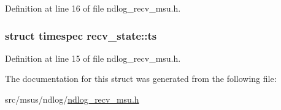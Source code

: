 Definition at line 16 of file ndlog\-\_\-recv\-\_\-msu.\-h.

\hypertarget{structrecv__state_aec1b8726e5167fb82a1b38624b3e81af}{
\subsubsection[{ts}]{\setlength{\rightskip}{0pt plus 5cm}struct timespec recv\-\_\-state\-::ts}}\label{structrecv__state_aec1b8726e5167fb82a1b38624b3e81af}


Definition at line 15 of file ndlog\-\_\-recv\-\_\-msu.\-h.



The documentation for this struct was generated from the following file\-:\begin{DoxyCompactItemize}
\item 
src/msus/ndlog/\hyperlink{ndlog__recv__msu_8h}{ndlog\-\_\-recv\-\_\-msu.\-h}\end{DoxyCompactItemize}
